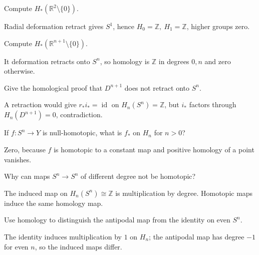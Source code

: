 \begin{problem}\label{prob:viii20-05}
Compute \(H_*(\mathbb R^2\setminus\{0\})\).
\end{problem}
\begin{solution}
Radial deformation retract gives \(S^1\), hence \(H_0=\mathbb Z,\ H_1=\mathbb Z\), higher groups zero.
\end{solution}

\begin{problem}\label{prob:viii20-06}
Compute \(H_*(\mathbb R^{n+1}\setminus\{0\})\).
\end{problem}
\begin{solution}
It deformation retracts onto \(S^n\), so homology is \(\mathbb Z\) in degrees \(0,n\) and zero otherwise.
\end{solution}

\begin{problem}[No retraction]\label{prob:viii20-07}
Give the homological proof that \(D^{n+1}\) does not retract onto \(S^n\).
\end{problem}
\begin{solution}
A retraction would give \(r_*i_*=\operatorname{id}\) on \(H_n(S^n)=\mathbb Z\), but \(i_*\) factors through \(H_n(D^{n+1})=0\), contradiction.
\end{solution}

\begin{problem}\label{prob:viii20-08}
If \(f:S^n\to Y\) is null-homotopic, what is \(f_*\) on \(H_n\) for \(n>0\)?
\end{problem}
\begin{solution}
Zero, because \(f\) is homotopic to a constant map and positive homology of a point vanishes.
\end{solution}

\begin{problem}\label{prob:viii20-09}
Why can maps \(S^n\to S^n\) of different degree not be homotopic?
\end{problem}
\begin{solution}
The induced map on \(H_n(S^n)\cong\mathbb Z\) is multiplication by degree. Homotopic maps induce the same homology map.
\end{solution}

\begin{problem}\label{prob:viii20-10}
Use homology to distinguish the antipodal map from the identity on even \(S^n\).
\end{problem}
\begin{solution}
The identity induces multiplication by \(1\) on \(H_n\); the antipodal map has degree \(-1\) for even \(n\), so the induced maps differ.
\end{solution}

